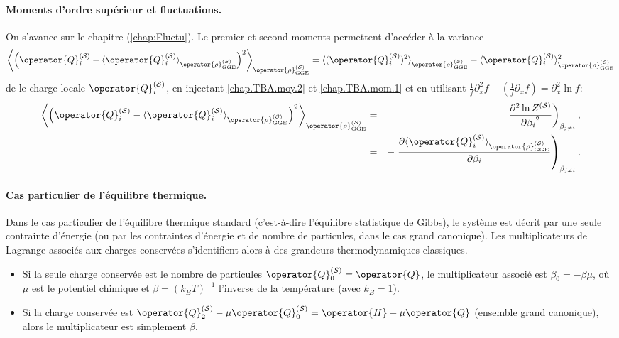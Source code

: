 \paragraph{Moments d’ordre supérieur et fluctuations.} On s'avance sur le chapitre (\ref{chap:Fluctu}).
Le premier et second moments permettent d’accéder à la variance 
\begin{eqnarray}
	 \left \langle \left (\operator{Q}_i^{(\mathcal{S})} - \langle\operator{Q}_i^{(\mathcal{S})} \rangle_{\operator{\rho}^{(\mathcal{S})}_{\mathrm{GGE}}} \right )^2  \right \rangle_{\operator{\rho}^{(\mathcal{S})}_{\mathrm{GGE}}} = \langle(\operator{Q}_i^{(\mathcal{S})})^2 \rangle_{\operator{\rho}^{(\mathcal{S})}_{\mathrm{GGE}}}  -  \langle\operator{Q}_i^{(\mathcal{S})} \rangle_{\operator{\rho}^{(\mathcal{S})}_{\mathrm{GGE}}}^2	
\end{eqnarray}
de le charge locale $\operator{Q}_i^{(\mathcal{S})}$, en injectant \eqref{chap.TBA.moy.2} et \eqref{chap.TBA.mom.1} et en utilisant $\frac{1}{f} \partial_x^2 f - ( \frac{1}{f} \partial_x f ) = \partial_x^2 \ln f  $:
\begin{eqnarray}
	\left \langle \left (\operator{Q}_i^{(\mathcal{S})} - \langle\operator{Q}_i^{(\mathcal{S})} \rangle_{\operator{\rho}^{(\mathcal{S})}_{\mathrm{GGE}}} \right )^2  \right \rangle_{\operator{\rho}^{(\mathcal{S})}_{\mathrm{GGE}}}  &=&	  \left . \frac{\partial^2 \ln Z^{(\mathcal{S})}  }{{\partial \beta_i}^2 }  \right )_{\beta_{j\neq i}},\\
	& = &  - \left . 	\frac{\partial \langle\operator{Q}_i^{(\mathcal{S})} \rangle_{\operator{\rho}^{(\mathcal{S})}_{\mathrm{GGE}}} }{\partial \beta_i } \right )_{\beta_{j\neq i}}.	
\end{eqnarray}

\paragraph{Cas particulier de l’équilibre thermique.}

Dans le cas particulier de l’équilibre thermique standard (c’est-à-dire l’équilibre statistique de Gibbs), le système est décrit par une seule contrainte d’énergie (ou par les contraintes d’énergie et de nombre de particules, dans le cas grand canonique). Les multiplicateurs de Lagrange associés aux charges conservées s’identifient alors à des grandeurs thermodynamiques classiques.

\begin{itemize}[label=$\bullet$]
	\item Si la seule charge conservée est le nombre de particules $\operator{Q}_0^{(\mathcal{S})} = \operator{Q}$, le multiplicateur associé est $\beta_0 = -\beta \mu$, où $\mu$ est le potentiel chimique et $\beta = (k_BT)^{-1}$ l’inverse de la température (avec $k_B = 1$).
	
	\item Si la charge conservée est $\operator{Q}_2^{(\mathcal{S})}-\mu\operator{Q}_0^{(\mathcal{S})}  = \operator{H} - \mu \operator{Q} $ (ensemble grand canonique), alors le multiplicateur est simplement $ \beta$.
\end{itemize}

